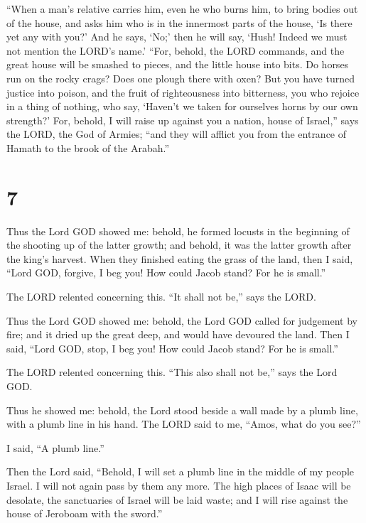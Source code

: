  ``When a man's relative carries him, even he who burns
him, to bring bodies out of the house, and asks him who is in the
innermost parts of the house, `Is there yet any with you?' And he says,
`No;' then he will say, `Hush! Indeed we must not mention the LORD's
name.'  ``For, behold, the LORD commands, and the great
house will be smashed to pieces, and the little house into bits.
 Do horses run on the rocky crags? Does one plough there
with oxen? But you have turned justice into poison, and the fruit of
righteousness into bitterness,  you who rejoice in a
thing of nothing, who say, `Haven't we taken for ourselves horns by our
own strength?'  For, behold, I will raise up against you
a nation, house of Israel,'' says the LORD, the God of Armies; ``and
they will afflict you from the entrance of Hamath to the brook of the
Arabah.''

\hypertarget{section-6}{%
\section{7}\label{section-6}}

 Thus the Lord GOD showed me: behold, he formed locusts in
the beginning of the shooting up of the latter growth; and behold, it
was the latter growth after the king's harvest.  When they
finished eating the grass of the land, then I said, ``Lord GOD, forgive,
I beg you! How could Jacob stand? For he is small.''

 The LORD relented concerning this. ``It shall not be,''
says the LORD.

 Thus the Lord GOD showed me: behold, the Lord GOD called
for judgement by fire; and it dried up the great deep, and would have
devoured the land.  Then I said, ``Lord GOD, stop, I beg
you! How could Jacob stand? For he is small.''

 The LORD relented concerning this. ``This also shall not
be,'' says the Lord GOD.

 Thus he showed me: behold, the Lord stood beside a wall
made by a plumb line, with a plumb line in his hand.  The
LORD said to me, ``Amos, what do you see?''

I said, ``A plumb line.''

Then the Lord said, ``Behold, I will set a plumb line in the middle of
my people Israel. I will not again pass by them any more. 
The high places of Isaac will be desolate, the sanctuaries of Israel
will be laid waste; and I will rise against the house of Jeroboam with
the sword.''

